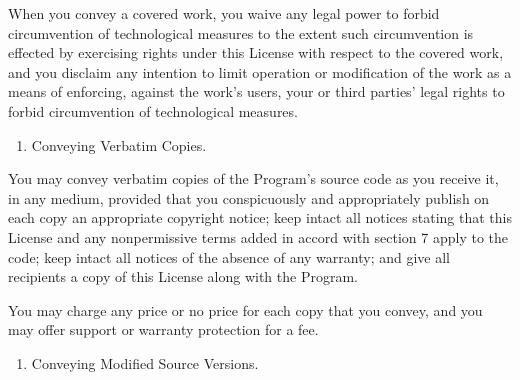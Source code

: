 \documentclass[letterpaper,10pt,english]{sphinxmanual}
\begin{document}
\sphinxAtStartPar
When you convey a covered work, you waive any legal power to forbid circumvention of technological measures to the extent such circumvention is effected by exercising rights under this License with respect to the covered work, and you disclaim any intention to limit operation or modification of the work as a means of enforcing, against the work’s users, your or third parties’ legal rights to forbid circumvention of technological measures.
\begin{enumerate}
%
\setcounter{enumi}{3}
\item {} 
\sphinxAtStartPar
Conveying Verbatim Copies.

\end{enumerate}

\sphinxAtStartPar
You may convey verbatim copies of the Program’s source code as you receive it, in any medium, provided that you conspicuously and appropriately publish on each copy an appropriate copyright notice; keep intact all notices stating that this License and any non\sphinxhyphen{}permissive terms added in accord with section 7 apply to the code; keep intact all notices of the absence of any warranty; and give all recipients a copy of this License along with the Program.

\sphinxAtStartPar
You may charge any price or no price for each copy that you convey, and you may offer support or warranty protection for a fee.
\begin{enumerate}
%
\setcounter{enumi}{4}
\item {} 
\sphinxAtStartPar
Conveying Modified Source Versions.

\end{enumerate}
\end{document}
